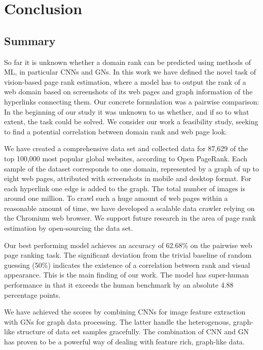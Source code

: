 \section{Conclusion}
\label{sec:conclusion}

\subsection{Summary}

So far it is unknown whether a domain rank can be predicted using methods of ML, in particular CNNs and GNs. In this work we have defined the novel task of vision-based page rank estimation, where a model has to output the rank of a web domain based on screenshots of its web pages and graph information of the hyperlinks connecting them. Our concrete formulation was a pairwise comparison: In the beginning of our study it was unknown to us whether, and if so to what extent, the task could be solved. We consider our work a feasibility study, seeking to find a potential correlation between domain rank and web page look.

We have created a comprehensive data set and collected data for 87,629 of the top 100,000 most popular global websites, according to Open PageRank. Each sample of the dataset corresponds to one domain, represented by a graph of up to eight web pages, attributed with screenshots in mobile and desktop format. For each hyperlink one edge is added to the graph. The total number of images is around one million. To crawl such a huge amount of web pages within a reasonable amount of time, we have developed a scalable data crawler relying on the Chromium web browser. We support future research in the area of page rank estimation by open-sourcing the data set.

Our best performing model achieves an accuracy of 62.68\% on the pairwise web page ranking task. The significant deviation from the trivial baseline of random guessing (50\%) indicates the existence of a correlation between rank and visual appearance. This is the main finding of our work. The model has super-human performance in that it exceeds the human benchmark by an absolute 4.88 percentage points.

We have achieved the scores by combining CNNs for image feature extraction with GNs for graph data processing. The latter handle the heterogenous, graph-like structure of data set samples gracefully. The combination of CNN and GN has proven to be a powerful way of dealing with feature rich, graph-like data.

